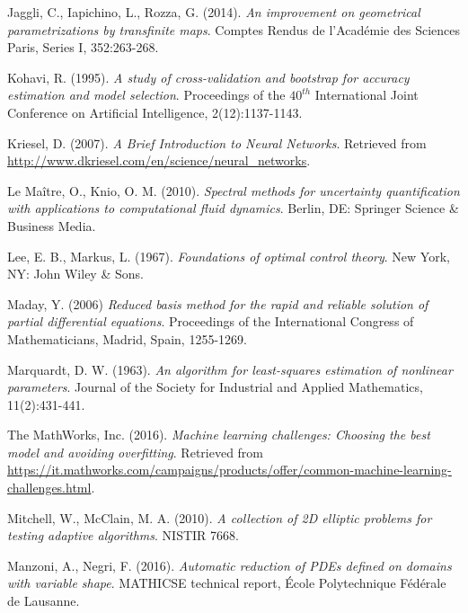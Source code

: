 \documentclass{elsarticle}
\numberwithin{equation}{section}
\theoremstyle{theorem}
\theoremstyle{definition}
\theoremstyle{remark}
\theoremstyle{proposition}
\numberwithin{figure}{section}
\begin{document}
\begin{thebibliography}{50}
		Jaggli, C., Iapichino, L., Rozza, G. (2014). \emph{An improvement on geometrical parametrizations by transfinite maps}. Comptes Rendus de l'Acad\'emie des Sciences Paris, Series I, 352:263-268. 
				
		
		Kohavi, R. (1995). \emph{A study of cross-validation and bootstrap for accuracy estimation and model selection}. Proceedings of the $40^{th}$ International Joint Conference on Artificial Intelligence, 2(12):1137-1143.
		
		
		Kriesel, D. (2007). \emph{A Brief Introduction to Neural Networks}. Retrieved from \url{http://www.dkriesel.com/en/science/neural_networks}.
		
		Le Ma\^{i}tre, O., Knio, O. M. (2010). \emph{Spectral methods for uncertainty quantification with applications to computational fluid dynamics}. Berlin, DE: Springer Science \& Business Media.
		
		Lee, E. B., Markus, L. (1967). \emph{Foundations of optimal control theory}. New York, NY: John Wiley \& Sons.
		
		Maday, Y. (2006) \emph{Reduced basis method for the rapid and reliable solution of partial differential equations}. Proceedings of the International Congress of Mathematicians, Madrid, Spain, 1255-1269.
		
		Marquardt, D. W. (1963). \emph{An algorithm for least-squares estimation of nonlinear parameters}. Journal of the Society for Industrial and Applied Mathematics, 11(2):431-441.
		
		The MathWorks, Inc. (2016). \emph{Machine learning challenges: Choosing the best model and avoiding overfitting}. Retrieved from \url{https://it.mathworks.com/campaigns/products/offer/common-machine-learning-challenges.html}.
		
		Mitchell, W., McClain, M. A. (2010). \emph{A collection of 2D elliptic problems for testing adaptive algorithms}. NISTIR 7668.
		
		Manzoni, A., Negri, F. (2016). \emph{Automatic reduction of PDEs defined on domains with variable shape}. MATHICSE technical report, \'Ecole Polytechnique F\'ed\'erale de Lausanne.
		

\end{thebibliography}
\end{document}
